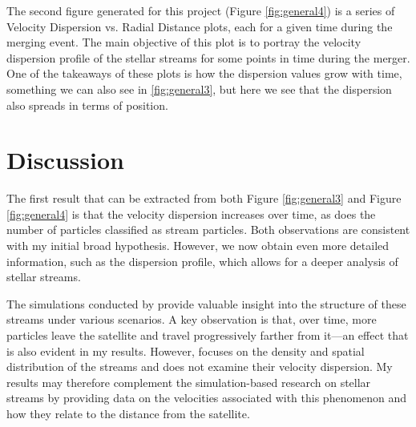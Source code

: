 \documentclass[linenumbers,trackchanges]{aastex7}
\begin{document}
\begin{figure*}[ht!]
\caption{Plot demonstrating how the mean velocity dispersion of the stellar streams evolve throughout the collision of M31 and MW. With the mean velocity dispersion plotted on the y-axis and time on the x-axis. We can clearly see how the velocity dispersion for the stellar streams grows as the merger continues to happen.}
\label{fig:general3}
\end{figure*}

The second figure generated for this project (Figure \ref{fig:general4}) is a series of Velocity Dispersion vs. Radial Distance plots, each for a given time during the merging event. The main objective of this plot is to portray the velocity dispersion profile of the stellar streams for some points in time during the merger. One of the takeaways of these plots is how the dispersion values grow with time, something we can also see in \ref{fig:general3}, but here we see that the dispersion also spreads in terms of position.

\begin{figure*}[ht!]
\caption{Plot demonstrating how the velocity dispersion looks like for different radii at key moments in time during the merger. Velocity dispersion is plotted in the y-axis and position (radius) in the x-axis. We can see some trends in the velocity dispersion profile, such as how the maximum values grow with time, and also where the regions with the most velocity dispersion are located at a given time}
\label{fig:general4}
\end{figure*}

 

\section{Discussion} \label{sec:discussion}

The first result that can be extracted from both Figure \ref{fig:general3} and Figure \ref{fig:general4} is that the velocity dispersion increases over time, as does the number of particles classified as stream particles. Both observations are consistent with my initial broad hypothesis. However, we now obtain even more detailed information, such as the dispersion profile, which allows for a deeper analysis of stellar streams.

The simulations conducted by \cite{Choi2007-lc} provide valuable insight into the structure of these streams under various scenarios. A key observation is that, over time, more particles leave the satellite and travel progressively farther from it—an effect that is also evident in my results. However, \cite{Choi2007-lc} focuses on the density and spatial distribution of the streams and does not examine their velocity dispersion. My results may therefore complement the simulation-based research on stellar streams by providing data on the velocities associated with this phenomenon and how they relate to the distance from the satellite.
\end{document}
